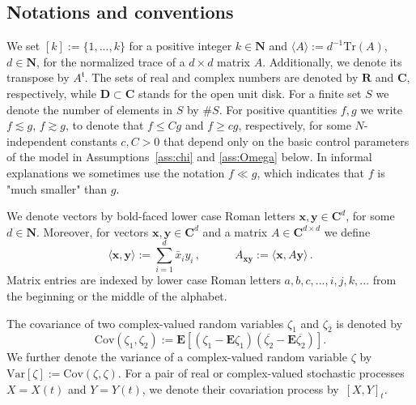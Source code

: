 \documentclass[10pt]{amsart}
\numberwithin{equation}{section}
\newcommand{\E}{\mathbf{E}}
\newcommand{\R}{\mathbf{R}}
\newcommand{\C}{\mathbf{C}}
\newcommand{\N}{\mathbf{N}}
\newcommand{\Cov}{\mathrm{Cov}}
\newcommand{\Var}{\mathrm{Var}}
\newcommand{\mt}{\mathfrak{t}}
\begin{document}
\subsection*{Notations and conventions}
We set $[k] := \{1, ... , k\}$ for a positive integer $k \in \N$ and $\langle A \rangle := d^{-1} \mathrm{Tr}(A)$, $d \in \N$, for the normalized trace of a $d \times d$ matrix $A$. Additionally, we denote its transpose by $A^\mt$. The sets of real and complex numbers are denoted by $\R$ and $\C$, respectively, while $\mathbf{D}\subset \C$ stands for the open unit disk. For a finite set $S$ we denote the number of elements in $S$ by $\# S$. For positive quantities $f, g$ we write $f \lesssim g$, $f \gtrsim g$, to denote that $f \le C g$ and $f \ge c g$, respectively, for some $N$-independent constants $c, C > 0$ that depend only on the basic control parameters of the model in Assumptions~\ref{ass:chi} and \ref{ass:Omega} below. In informal explanations we sometimes use the notation $f\ll g$, which indicates that $f$ is "much smaller" than $g$.

We denote vectors by bold-faced lower case Roman letters $\boldsymbol{x}, \boldsymbol{y} \in \C^{d}$, for some $d \in \N$. Moreover, for vectors $\boldsymbol{x}, \boldsymbol{y} \in \C^{d}$ and a matrix $A\in\C^{d\times d}$ we define
 \begin{equation*}
	\langle \boldsymbol{x}, \boldsymbol{y} \rangle := \sum_{i=1}^d \bar{x}_i y_i\,, 
	\qquad\quad A_{\boldsymbol{x} \boldsymbol{y}} := \langle \boldsymbol{x}, A \boldsymbol{y} \rangle\,. 
\end{equation*}
Matrix entries are indexed by lower case Roman letters $a, b, c , ... ,i,j,k,... $ from the beginning or the middle of the alphabet.

The covariance of two complex-valued random variables $\zeta_1$ and $\zeta_2$ is denoted by
\begin{equation*}
\Cov(\zeta_1,\zeta_2):=\E\left[ (\zeta_1-\E\zeta_1)(\overline{\zeta_2}-\E\overline{\zeta_2})\right].
\end{equation*} 
We further denote the variance of a complex-valued random variable $\zeta$ by $\Var[\zeta]:=\Cov(\zeta,\zeta)$. For a pair of real or complex-valued stochastic processes $X=X(t)$ and $Y=Y(t)$, we denote their covariation process by~$[X,Y]_t$.
\end{document}
